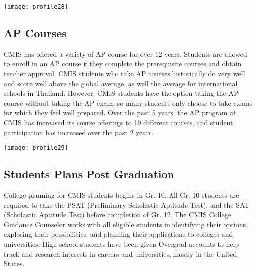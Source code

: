 \texttt{[image: profile28]}

\subsection{AP Courses}

CMIS has offered a variety of AP course for over 12 years. Students are allowed to enroll in an AP course if they complete the prerequisite courses and obtain teacher approval.  CMIS students who take AP courses historically do very well and score well above the global average, as well the average for international schools in Thailand.  However, CMIS students have the option taking the AP course without taking the AP exam, so many students only choose to take exams for which they feel well prepared.  Over the past 5 years, the AP program at CMIS has increased its course offerings to 19 different courses, and student participation has increased over the past 2 years.

\texttt{[image: profile29]}

\subsection{Students Plans Post Graduation}

College planning for CMIS students begins in Gr. 10.  All Gr. 10 students are required to take the PSAT (Preliminary Scholastic Aptitude Test), and the SAT (Scholastic Aptitude Test) before completion of Gr. 12.  The CMIS College Guidance Counselor works with all eligible students in identifying their options, exploring their possibilities, and planning their applications to colleges and universities.  High school students have been given Overgrad accounts to help track and research interests in careers and universities, mostly in the United States.  




